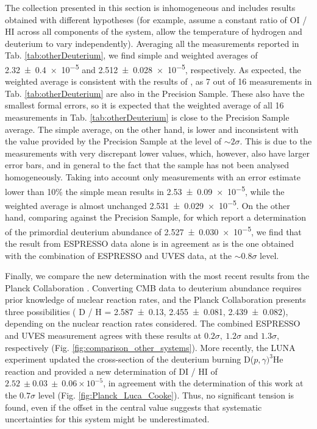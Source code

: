 \documentclass[fleqn,usenatbib]{mnras}
\makeatletter
\DeclareRobustCommand{\ion}[2]{%
  \mbox{#1\check@mathfonts\fontsize\sf@size\z@\selectfont #2}%
}
\makeatother
\begin{document}
The collection presented in this section is inhomogeneous and includes results obtained with different hypotheses (for example, \citet{noterdaeme_2012, balashev_2016} assume a constant ratio of \ion{O}{I}/\ion{H}{I} across all components of the system, \citet{cooke_18} allow the temperature of hydrogen and deuterium to vary independently). Averaging all the measurements reported in Tab. \ref{tab:otherDeuterium}, we find simple and weighted averages of \num{2.32 \pm 0.4e-5} and \num{2.512\pm 0.028e-5}, respectively. As expected, the weighted average is consistent with the results of \citet{cooke_18}, as 7 out of 16 measurements in Tab. \ref{tab:otherDeuterium} are also in the Precision Sample. These also have the smallest formal errors, so it is expected that the weighted average of all 16 measurements in Tab. \ref{tab:otherDeuterium} is close to the Precision Sample average. The simple average, on the other hand, is lower and inconsistent with the value provided by the Precision Sample at the level of $\sim2 \sigma$. This is due to the measurements with very discrepant lower values, which, however, also have larger error bars, and in general to the fact that the sample has not been analysed homogeneously. Taking into account only measurements with an error estimate lower than 10\% the simple mean results in \num{2.53 \pm 0.09e-5}, while the weighted average is almost unchanged \num{2.531 \pm 0.029e-5}. On the other hand, comparing against the Precision Sample, for which \citet{cooke_18} report a determination of the primordial deuterium abundance of \num{2.527\pm0.030e-5}, we find that the result from ESPRESSO data alone is in agreement as is the one obtained with the combination of ESPRESSO and UVES data, at the $\sim0.8\sigma$ level.  

Finally, we compare the new determination with the most recent results from the Planck Collaboration \citep{Planck_2018_cosmo_pars}. Converting CMB data to deuterium abundance requires prior knowledge of nuclear reaction rates, and the Planck Collaboration presents three possibilities (\ion{D}{}/\ion{H}{} = \num{2.587 \pm 0.13}, \num{2.455 \pm 0.081}, \num{2.439 \pm 0.082}), depending on the nuclear reaction rates considered. The combined ESPRESSO and UVES measurement agrees with these results at $0.2\sigma,\ 1.2\sigma$ and $1.3\sigma$, respectively (Fig. \ref{fig:comparison_other_systems}). More recently, the LUNA experiment updated the cross-section of the deuterium burning D($p,\gamma)^3$He reaction \citep{luna_deuterium} and provided a new determination of \ion{D}{I}/\ion{H}{I} of $2.52\ \pm 0.03\ \pm\ 0.06 \times 10^{-5}$, in agreement with the determination of this work at the $0.7\sigma$ level (Fig. \ref{fig:Planck_Luca_Cooke}). Thus, no significant tension is found, even if the offset in the central value suggests that systematic uncertainties for this system might be underestimated.
\end{document}
